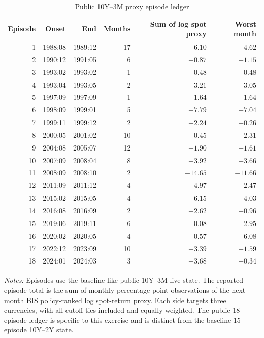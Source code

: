 \begin{table}[H]
\centering
\caption{Public 10Y--3M proxy episode ledger}
\label{tab:v03-public-episodes}
\scriptsize
\begin{tabular}{rrrrrr}
\toprule
Episode & Onset & End & Months & Sum of log spot proxy & Worst month \\
\midrule
1 & 1988:08 & 1989:12 & 17 & $-6.10$ & $-4.62$ \\
2 & 1990:12 & 1991:05 & 6 & $-0.87$ & $-1.15$ \\
3 & 1993:02 & 1993:02 & 1 & $-0.48$ & $-0.48$ \\
4 & 1993:04 & 1993:05 & 2 & $-3.21$ & $-3.05$ \\
5 & 1997:09 & 1997:09 & 1 & $-1.64$ & $-1.64$ \\
6 & 1998:09 & 1999:01 & 5 & $-7.79$ & $-7.04$ \\
7 & 1999:11 & 1999:12 & 2 & $+2.24$ & $+0.26$ \\
8 & 2000:05 & 2001:02 & 10 & $+0.45$ & $-2.31$ \\
9 & 2004:08 & 2005:07 & 12 & $+1.90$ & $-1.61$ \\
10 & 2007:09 & 2008:04 & 8 & $-3.92$ & $-3.66$ \\
11 & 2008:09 & 2008:10 & 2 & $-14.65$ & $-11.66$ \\
12 & 2011:09 & 2011:12 & 4 & $+4.97$ & $-2.47$ \\
13 & 2015:02 & 2015:05 & 4 & $-6.15$ & $-4.03$ \\
14 & 2016:08 & 2016:09 & 2 & $+2.62$ & $+0.96$ \\
15 & 2019:06 & 2019:11 & 6 & $-0.08$ & $-2.95$ \\
16 & 2020:02 & 2020:05 & 4 & $-0.57$ & $-6.08$ \\
17 & 2022:12 & 2023:09 & 10 & $+3.39$ & $-1.59$ \\
18 & 2024:01 & 2024:03 & 3 & $+3.68$ & $+0.34$ \\
\bottomrule
\end{tabular}

\begin{minipage}{0.94\textwidth}
\footnotesize\emph{Notes:} Episodes use the baseline-like public 10Y--3M live state. The reported episode total is the sum of monthly percentage-point observations of the next-month BIS policy-ranked log spot-return proxy. Each side targets three currencies, with all cutoff ties included and equally weighted. The public 18-episode ledger is specific to this exercise and is distinct from the baseline 15-episode 10Y--2Y state.
\end{minipage}
\end{table}
